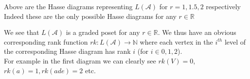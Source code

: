 \documentclass[12pt]{article}
\newcommand{\N}{\mathbb{N}}
\newcommand{\R}{\mathbb{R}}
\newenvironment{remark}[1][Remark]{\begin{trivlist}
\item[\hskip \labelsep {\bfseries #1}]}{\end{trivlist}}
\begin{document}
\begin{remark}
	Above are the Hasse diagrams representing $L(\mathcal{A})$ for $r=1,1.5,2$ respectively Indeed these are the only possible Hasse diagrams for any  $r\in \R$
\end{remark}
\begin{remark}
	We see that $L(\mathcal{A})$ is a graded poset for any $r\in \R$. We thus have an obvious corresponding rank function $rk: L(\mathcal{A}) \to \N$ where each vertex in the $i^{th}$ level of the corresponding Hasse diagram has rank $i$ (for  $i\in {0,1,2} $).\\
	For example in the first diagram we can clearly see $rk(V) = 0$, $rk(a) = 1, rk(ade) = 2$ etc.
\end{remark}
\end{document}
